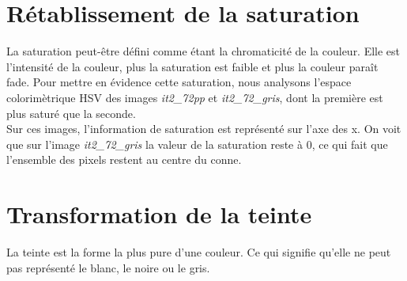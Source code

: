 \documentclass[a4paper,10pt]{article}
\begin{document}

\section{Rétablissement de la saturation}
La saturation peut-être défini comme étant la chromaticité de la couleur. Elle est l'intensité de la couleur, plus
la saturation est faible et plus la couleur paraît fade. Pour mettre en évidence cette saturation, nous analysons
l'espace colorimètrique HSV des images \textit{it2\_72pp} et \textit{it2\_72\_gris}, dont la première est plus saturé
que la seconde.\\


Sur ces images, l'information de saturation est représenté sur l'axe des x. On voit que sur l'image \textit{it2\_72\_gris} la
valeur de la saturation reste à 0, ce qui fait que l'ensemble des pixels restent au centre du conne.

\section{Transformation de la teinte}
La teinte est la forme la plus pure d'une couleur. Ce qui signifie qu'elle ne peut pas représenté le blanc, le noire ou le gris.
\end{document}
